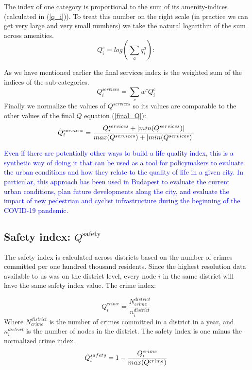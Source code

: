 The index of one category is proportional to the sum of its amenity-indices (calculated in (\ref{q_i})). To treat this number on the right scale (in practice we can get very large and very small numbers) we take the natural logarithm of the sum across amenities.
\begin{equation}
	Q_i^c=log(\sum_a q_i^a):
\end{equation}

As we have mentioned earlier the final services index is the weighted sum of the indices of the sub-categories.
$$Q_i^{services} =\sum_c w^cQ_i^c $$
Finally we normalize the values of $Q^{services}$ so its values are comparable to the other values of the final $Q$ equation (\ref{final_Q}):
\begin{equation}
	\Tilde{Q}_i^{services} =\frac{Q_i^{services}+|min(Q^{services})|}{max(Q^{services})+|min(Q^{services})|}
\end{equation}

\textcolor{blue}{Even if there are potentially other ways to build a life quality index, this is a synthetic way of doing it that can be used as a tool for policymakers to evaluate the urban conditions and how they relate to the quality of life in a given city. In particular, this approach has been used in Budapest to evaluate the current urban conditions, plan future developments along the city, and evaluate the impact of new pedestrian and cyclist infrastructure during the beginning of the COVID-19 pandemic.}

\subsection{Safety index: \texorpdfstring{$Q^{\text{safety}}$}{Q\^safety}} \label{safety}

The safety index is calculated across districts based on the number of crimes committed per one hundred thousand residents. Since the highest resolution data available to us was on the district level, every node $i$ in the same district will have the same safety index value. The crime index:

$$Q_i^{crime}=\frac{N^{district}_{crime}}{n_i^{district}}$$
Where $N^{district}_{crime}$ is the number of crimes committed in a district in a year, and $n_i^{district}$ is the number of nodes in the district. The safety index is one minus the normalized crime index.
\begin{equation}
	\Tilde{Q}_i^{safety}=1-\frac{Q_i^{crime}}{max(Q^{crime})}
\end{equation}

